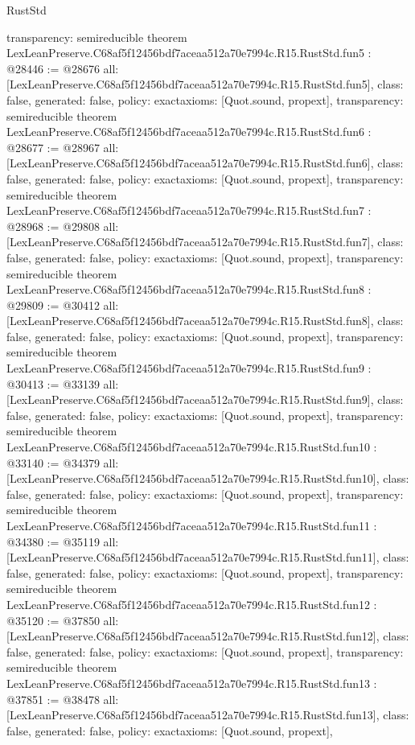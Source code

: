 \begin{lexlean}{RustStd}
\begin{coremodule}
{  transparency: semireducible
}
theorem LexLeanPreserve.C68af5f12456bdf7aceaa512a70e7994c.R15.RustStd.fun5 : @28446 := @28676 {
  all: [LexLeanPreserve.C68af5f12456bdf7aceaa512a70e7994c.R15.RustStd.fun5],
  class: false,
  generated: false,
  policy: exact{axioms: [Quot.sound, propext]},
  transparency: semireducible
}
theorem LexLeanPreserve.C68af5f12456bdf7aceaa512a70e7994c.R15.RustStd.fun6 : @28677 := @28967 {
  all: [LexLeanPreserve.C68af5f12456bdf7aceaa512a70e7994c.R15.RustStd.fun6],
  class: false,
  generated: false,
  policy: exact{axioms: [Quot.sound, propext]},
  transparency: semireducible
}
theorem LexLeanPreserve.C68af5f12456bdf7aceaa512a70e7994c.R15.RustStd.fun7 : @28968 := @29808 {
  all: [LexLeanPreserve.C68af5f12456bdf7aceaa512a70e7994c.R15.RustStd.fun7],
  class: false,
  generated: false,
  policy: exact{axioms: [Quot.sound, propext]},
  transparency: semireducible
}
theorem LexLeanPreserve.C68af5f12456bdf7aceaa512a70e7994c.R15.RustStd.fun8 : @29809 := @30412 {
  all: [LexLeanPreserve.C68af5f12456bdf7aceaa512a70e7994c.R15.RustStd.fun8],
  class: false,
  generated: false,
  policy: exact{axioms: [Quot.sound, propext]},
  transparency: semireducible
}
theorem LexLeanPreserve.C68af5f12456bdf7aceaa512a70e7994c.R15.RustStd.fun9 : @30413 := @33139 {
  all: [LexLeanPreserve.C68af5f12456bdf7aceaa512a70e7994c.R15.RustStd.fun9],
  class: false,
  generated: false,
  policy: exact{axioms: [Quot.sound, propext]},
  transparency: semireducible
}
theorem LexLeanPreserve.C68af5f12456bdf7aceaa512a70e7994c.R15.RustStd.fun10 : @33140 := @34379 {
  all: [LexLeanPreserve.C68af5f12456bdf7aceaa512a70e7994c.R15.RustStd.fun10],
  class: false,
  generated: false,
  policy: exact{axioms: [Quot.sound, propext]},
  transparency: semireducible
}
theorem LexLeanPreserve.C68af5f12456bdf7aceaa512a70e7994c.R15.RustStd.fun11 : @34380 := @35119 {
  all: [LexLeanPreserve.C68af5f12456bdf7aceaa512a70e7994c.R15.RustStd.fun11],
  class: false,
  generated: false,
  policy: exact{axioms: [Quot.sound, propext]},
  transparency: semireducible
}
theorem LexLeanPreserve.C68af5f12456bdf7aceaa512a70e7994c.R15.RustStd.fun12 : @35120 := @37850 {
  all: [LexLeanPreserve.C68af5f12456bdf7aceaa512a70e7994c.R15.RustStd.fun12],
  class: false,
  generated: false,
  policy: exact{axioms: [Quot.sound, propext]},
  transparency: semireducible
}
theorem LexLeanPreserve.C68af5f12456bdf7aceaa512a70e7994c.R15.RustStd.fun13 : @37851 := @38478 {
  all: [LexLeanPreserve.C68af5f12456bdf7aceaa512a70e7994c.R15.RustStd.fun13],
  class: false,
  generated: false,
  policy: exact{axioms: [Quot.sound, propext]},
}
\end{coremodule}
\end{lexlean}
